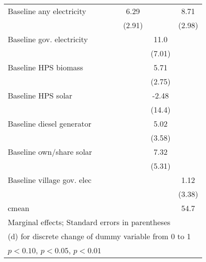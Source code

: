 \begin{table}[htbp]
\begin{tabular*}{1\hsize}{@{\hskip\tabcolsep\extracolsep\fill}l*{6}{c}}
Baseline any electricity&                  &                  &                  &     6.29\sym{**} &                  &     8.71\sym{***}\\
                &                  &                  &                  &   (2.91)         &                  &   (2.98)         \\
Baseline gov. electricity&                  &                  &                  &                  &     11.0         &                  \\
                &                  &                  &                  &                  &   (7.01)         &                  \\
Baseline HPS biomass&                  &                  &                  &                  &     5.71\sym{**} &                  \\
                &                  &                  &                  &                  &   (2.75)         &                  \\
Baseline HPS solar&                  &                  &                  &                  &    -2.48         &                  \\
                &                  &                  &                  &                  &   (14.4)         &                  \\
Baseline diesel generator&                  &                  &                  &                  &     5.02         &                  \\
                &                  &                  &                  &                  &   (3.58)         &                  \\
Baseline own/share solar&                  &                  &                  &                  &     7.32         &                  \\
                &                  &                  &                  &                  &   (5.31)         &                  \\
Baseline village gov. elec&                  &                  &                  &                  &                  &     1.12         \\
                &                  &                  &                  &                  &                  &   (3.38)         \\
\midrule
cmean           &                  &                  &                  &                  &                  &     54.7         \\
\bottomrule
\multicolumn{7}{l}{\footnotesize Marginal effects; Standard errors in parentheses}\\
\multicolumn{7}{l}{\footnotesize  (d) for discrete change of dummy variable from 0 to 1}\\
\multicolumn{7}{l}{\footnotesize \sym{*} \(p<0.10\), \sym{**} \(p<0.05\), \sym{***} \(p<0.01\)}\\
\end{tabular*}
\end{table}
